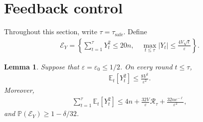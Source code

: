 \documentclass[11pt]{article}
\newtheorem{lemma}[lemma]{Lemma}
\newcommand{\E}{\mathbb E}
\newcommand{\Pp}{\mathbb P}
\newcommand{\1}{\mathbf 1}
\newcommand{\eps}{\varepsilon}
\begin{document}
\section{Feedback control}
\label{app:feedback}
Throughout this section, write $\tau=\tau_{\mathrm{safe}}$. Define
\begin{align}
    \mathcal E_Y
    =\left\{
    \sum_{t=1}^\tau Y_t^2\leq20n,
    \quad
    \max_{t\leq\tau}|Y_t|\leq\frac{4V\sqrt\ell}{\eps}
    \right\}.
    \label{eq:feedback-good-event}
\end{align}
\begin{lemma}
    \label{lem:feedback}
    Suppose that $\eps=\eps_0\leq1/2$. On every round $t\leq\tau$,
    \begin{align}
        \E_t[Y_t^2]\leq\frac{8V^2}{\eps^2}.
        \label{eq:feedback-roundwise}
    \end{align}
    Moreover,
    \begin{align}
        \sum_{t=1}^\tau\E_t[Y_t^2]
        \leq4n+\frac{32V}{\eps}\mathcal R_\tau
        +\frac{32ne^{-\ell}}{\eps^2},
        \label{eq:feedback-self-bound}
    \end{align}
    and $\Pp(\mathcal E_Y)\geq1-\delta/32$.
\end{lemma}
\end{document}
